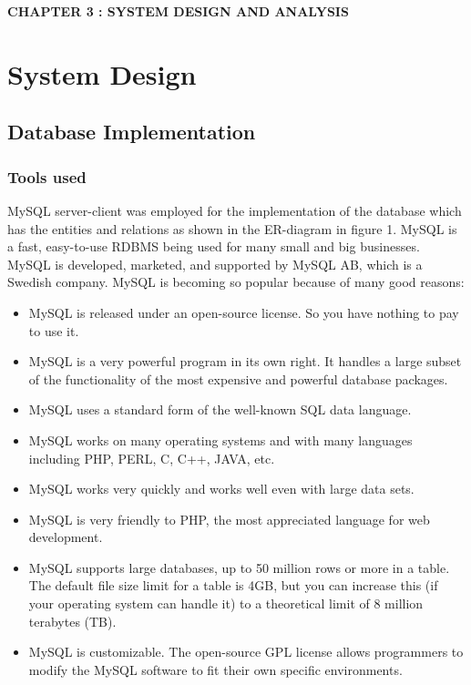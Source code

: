 \documentclass[hidelinks=true]{article}
\begin{document}
\pagebreak
\begin{center}
\vspace*{\fill}
\LARGE{\textbf{CHAPTER 3 : SYSTEM DESIGN AND ANALYSIS}}
\vspace*{\fill}
\end{center}

\pagebreak
\section{System Design}
\subsection{Database Implementation}
\subsubsection{Tools used}
MySQL server-client was employed for the implementation of the database which has the entities and relations as shown in the ER-diagram in figure 1. MySQL is a fast, easy-to-use RDBMS being used for many small and big businesses. MySQL is developed, marketed, and supported by MySQL AB, which is a Swedish company. MySQL is becoming so popular because of many good reasons:

\begin{itemize}
\item {MySQL is released under an open-source license. So you have nothing to pay to use it.}
\item {MySQL is a very powerful program in its own right. It handles a large subset of the functionality of the most expensive and powerful database packages.}
\item {MySQL uses a standard form of the well-known SQL data language.}
\item{MySQL works on many operating systems and with many languages including PHP, PERL, C, C++, JAVA, etc.}
\item{MySQL works very quickly and works well even with large data sets.}
\item {MySQL is very friendly to PHP, the most appreciated language for web development.}
\item{MySQL supports large databases, up to 50 million rows or more in a table. The default file size limit for a table is 4GB, but you can increase this (if your operating system can handle it) to a theoretical limit of 8 million terabytes (TB).}
\item{MySQL is customizable. The open-source GPL license allows programmers to modify the MySQL software to fit their own specific environments.}
\end{itemize}
\end{document}
